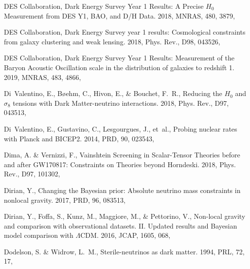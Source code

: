 \documentclass[longauth,traditabstract]{aa}
\def\mnras{{MNRAS}}
\def\prd{{PRD}}
\def\prl{{PRL}}
\begin{document}
\begin{thebibliography}{379}
{DES Collaboration}, {Dark Energy Survey Year 1 Results: A Precise $H_0$
  Measurement from DES Y1, BAO, and D/H Data}. 2018{}, \mnras, 480,
  3879, 

{DES Collaboration}, {Dark Energy Survey year 1 results: Cosmological
  constraints from galaxy clustering and weak lensing}. 2018{},
  Phys. Rev., D98, 043526, 

{DES Collaboration}, {Dark Energy Survey Year 1 Results: Measurement of the
  Baryon Acoustic Oscillation scale in the distribution of galaxies to redshift
  1}. 2019, \mnras, 483, 4866, 

Di~Valentino, E., Bøehm, C., Hivon, E., \& Bouchet, F.~R., {Reducing the $H_0$
  and $\sigma_8$ tensions with Dark Matter-neutrino interactions}. 2018, Phys.
  Rev., D97, 043513, 

Di~Valentino, E., Gustavino, C., Lesgourgues, J., {et~al.}, {Probing nuclear
  rates with Planck and BICEP2}. 2014, \prd, 90, 023543, 

Dima, A. \& Vernizzi, F., {Vainshtein Screening in Scalar-Tensor Theories
  before and after GW170817: Constraints on Theories beyond Horndeski}. 2018,
  Phys. Rev., D97, 101302, 

Dirian, Y., {Changing the Bayesian prior: Absolute neutrino mass constraints in
  nonlocal gravity}. 2017, \prd, 96, 083513, 

Dirian, Y., Foffa, S., Kunz, M., Maggiore, M., \& Pettorino, V., {Non-local
  gravity and comparison with observational datasets. II. Updated results and
  Bayesian model comparison with $\Lambda$CDM}. 2016, JCAP, 1605, 068,

Dodelson, S. \& Widrow, L.~M., {Sterile-neutrinos as dark matter}. 1994, \prl,
  72, 17, 


\end{thebibliography}
\end{document}
